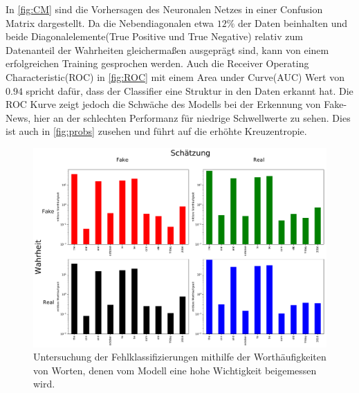 In \autoref{fig:CM} sind die Vorhersagen des Neuronalen Netzes in einer Confusion Matrix dargestellt. 
Da die Nebendiagonalen etwa $12\%$ der Daten beinhalten und beide Diagonalelemente(True Positive und True Negative) 
relativ zum Datenanteil der Wahrheiten gleichermaßen ausgeprägt sind, kann von einem erfolgreichen Training gesprochen 
werden.
Auch die Receiver Operating Characteristic(ROC) in \autoref{fig:ROC} mit einem Area under Curve(AUC) Wert von $0.94$ spricht dafür, dass 
der Classifier eine Struktur in den Daten erkannt hat.
Die ROC Kurve zeigt jedoch die Schwäche des Modells bei der Erkennung von Fake-News, hier an der schlechten 
Performanz für niedrige Schwellwerte zu sehen.
Dies ist auch in \autoref{fig:probs} zusehen und führt auf die erhöhte Kreuzentropie.

\begin{figure}
    \centering
    \includegraphics[width=\textwidth]{pictures/cnfn_hist.pdf}
    \caption{Untersuchung der Fehlklassifizierungen mithilfe der Worthäufigkeiten von Worten, denen vom 
            Modell eine hohe Wichtigkeit beigemessen wird.}
    \label{fig:CM_i}
\end{figure}

